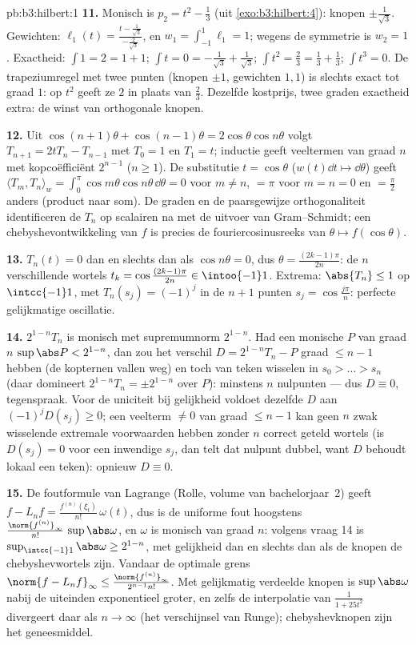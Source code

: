 \begin{solution}{pb:b3:hilbert:1}
\textbf{11.} Monisch is $p_2 = t^2 - \frac13$ (uit
\cref{exo:b3:hilbert:4}): knopen $\pm\frac1{\sqrt3}$. Gewichten:
$\ell_1(t) = \frac{t - \frac1{\sqrt3}}{-\frac2{\sqrt3}}$, en $w_1
= \int_{-1}^1\ell_1 = 1$; wegens de symmetrie is $w_2 = 1$.
Exactheid: $\int 1 = 2 = 1 + 1$; $\int t = 0 = -\frac1{\sqrt3} +
\frac1{\sqrt3}$; $\int t^2 = \frac23 = \frac13 + \frac13$; $\int
t^3 = 0$. De trapeziumregel met twee punten (knopen $\pm1$,
gewichten $1, 1$) is slechts exact tot graad $1$: op $t^2$ geeft
ze $2$ in plaats van $\frac23$. Dezelfde kostprijs, twee graden
exactheid extra: de winst van orthogonale knopen.

\textbf{12.} Uit $\cos(n{+}1)\theta + \cos(n{-}1)\theta =
2\cos\theta\cos n\theta$ volgt $T_{n+1} = 2tT_n - T_{n-1}$ met
$T_0 = 1$ en $T_1 = t$; inductie geeft veeltermen van graad $n$
met kopcoëfficiënt $2^{n-1}$ ($n \geq 1$). De substitutie $t =
\cos\theta$ ($w(t)\dd t \mapsto \dd\theta$) geeft $\langle T_m,
T_n\rangle_w = \int_0^\pi\cos m\theta\cos n\theta\,\dd\theta = 0$
voor $m \neq n$, $= \pi$ voor $m = n = 0$ en $= \frac\pi2$
anders (product naar som). De graden en de paarsgewijze
orthogonaliteit identificeren de $T_n$ op scalairen na met de
uitvoer van Gram--Schmidt; een chebyshevontwikkeling van $f$ is
precies de fouriercosinusreeks van $\theta \mapsto
f(\cos\theta)$.

\textbf{13.} $T_n(t) = 0$ dan en slechts dan als $\cos n\theta =
0$, dus $\theta = \frac{(2k-1)\pi}{2n}$: de $n$ verschillende
wortels $t_k = \cos\frac{(2k-1)\pi}{2n} \in \intoo{-1}1$.
Extrema: $\abs{T_n} \leq 1$ op $\intcc{-1}1$, met $T_n(s_j) =
(-1)^j$ in de $n + 1$ punten $s_j = \cos\frac{j\pi}n$: perfecte
gelijkmatige oscillatie.

\textbf{14.} $2^{1-n}T_n$ is monisch met supremumnorm $2^{1-n}$.
Had een monische $P$ van graad $n$ $\sup\abs P < 2^{1-n}$, dan
zou het verschil $D = 2^{1-n}T_n - P$ graad $\leq n - 1$ hebben
(de kopternen vallen weg) en toch van teken wisselen in $s_0 >
\dots > s_n$ (daar domineert $2^{1-n}T_n = \pm2^{1-n}$ over
$P$): minstens $n$ nulpunten --- dus $D \equiv 0$, tegenspraak.
Voor de uniciteit bij gelijkheid voldoet dezelfde $D$ aan
$(-1)^jD(s_j) \geq 0$; een veelterm $\ne 0$ van graad $\leq n-1$
kan geen $n$ zwak wisselende extremale voorwaarden hebben zonder
$n$ correct geteld wortels (is $D(s_j) = 0$ voor een inwendige
$s_j$, dan telt dat nulpunt dubbel, want $D$ behoudt lokaal een
teken): opnieuw $D \equiv 0$.

\textbf{15.} De foutformule van Lagrange (Rolle, volume van
bachelorjaar~2) geeft $f - L_nf = \frac{f^{(n)}(\xi_t)}
{n!}\,\omega(t)$, dus is de uniforme fout hoogstens
$\frac{\norm{f^{(n)}}_\infty} {n!}\,\sup\abs\omega$, en $\omega$
is monisch van graad $n$: volgens vraag 14 is
$\sup_{\intcc{-1}1}\abs\omega \geq 2^{1-n}$, met gelijkheid dan
en slechts dan als de knopen de chebyshevwortels zijn. Vandaar de
optimale grens $\norm{f - L_nf}_\infty \leq
\frac{\norm{f^{(n)}}_\infty}{2^{n-1}n!}$. Met gelijkmatig
verdeelde knopen is $\sup\abs\omega$ nabij de uiteinden
exponentieel groter, en zelfs de interpolatie van $\frac1{1 +
25t^2}$ divergeert daar als $n \to \infty$ (het verschijnsel van
Runge); chebyshevknopen zijn het geneesmiddel.


\end{solution}

